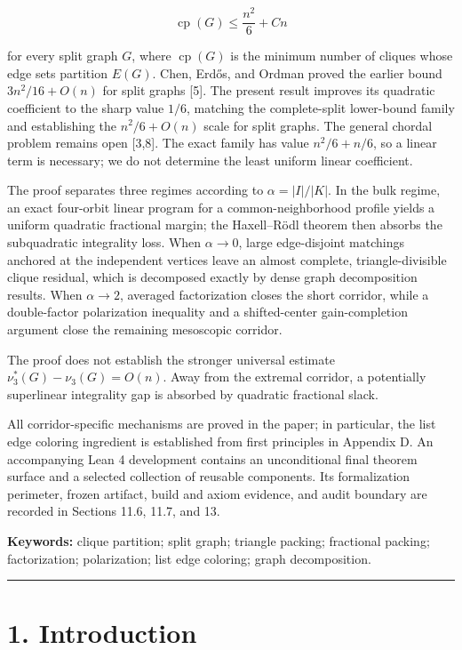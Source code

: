 \documentclass[
  american,
  11pt,
  a4paper,
]{article}
\begin{document}
\[
\operatorname{cp}(G)
\le
\frac{n^2}{6}+Cn
\]

for every split graph \(G\), where \(\operatorname{cp}(G)\) is the minimum number of cliques whose edge sets partition \(E(G)\). Chen, Erdős, and Ordman proved the earlier bound \(3n^2/16+O(n)\) for split graphs {[}5{]}. The present result improves its quadratic coefficient to the sharp value \(1/6\), matching the complete-split lower-bound family and establishing the \(n^2/6+O(n)\) scale for split graphs. The general chordal problem remains open {[}3,8{]}. The exact family has value \(n^2/6+n/6\), so a linear term is necessary; we do not determine the least uniform linear coefficient.

The proof separates three regimes according to \(\alpha=|I|/|K|\). In the bulk regime, an exact four-orbit linear program for a common-neighborhood profile yields a uniform quadratic fractional margin; the Haxell--Rödl theorem then absorbs the subquadratic integrality loss. When \(\alpha\to0\), large edge-disjoint matchings anchored at the independent vertices leave an almost complete, triangle-divisible clique residual, which is decomposed exactly by dense graph decomposition results. When \(\alpha\to2\), averaged factorization closes the short corridor, while a double-factor polarization inequality and a shifted-center gain-completion argument close the remaining mesoscopic corridor.

The proof does not establish the stronger universal estimate \(\nu_3^*(G)-\nu_3(G)=O(n)\). Away from the extremal corridor, a potentially superlinear integrality gap is absorbed by quadratic fractional slack.

All corridor-specific mechanisms are proved in the paper; in particular, the list edge coloring ingredient is established from first principles in Appendix D. An accompanying Lean 4 development contains an unconditional final theorem surface and a selected collection of reusable components. Its formalization perimeter, frozen artifact, build and axiom evidence, and audit boundary are recorded in Sections 11.6, 11.7, and 13.

\textbf{Keywords:} clique partition; split graph; triangle packing; fractional packing; factorization; polarization; list edge coloring; graph decomposition.

\begin{center}\rule{0.5\linewidth}{0.5pt}\end{center}

\section{1. Introduction}\label{introduction}
\end{document}
